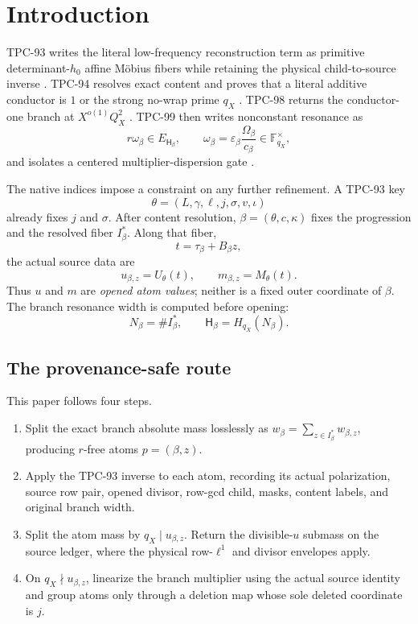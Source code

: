 \section{Introduction}
\label{sec:introduction}

TPC-93 writes the literal low-frequency reconstruction term as
primitive determinant-\(h_0\) affine M\"obius fibers while retaining
the physical child-to-source inverse \citep{WangTPC93}.  TPC-94
resolves exact content and proves that a literal additive conductor
is \(1\) or the strong no-wrap prime \(q_X\)
\citep{WangTPC94}.  TPC-98 returns the conductor-one branch at
\(X^{o(1)}Q_X^2\) \citep{WangTPC98}.  TPC-99 then writes
nonconstant resonance as
\[
 r\omega_\beta\in E_{\mathsf H_\beta},\qquad
 \omega_\beta
 =
 \varepsilon_\beta\frac{\Omega_\beta}{c_\beta}
 \in\mathbb F_{q_X}^{\times},
\]
and isolates a centered multiplier-dispersion gate
\citep{WangTPC99}.

The native indices impose a constraint on any further refinement.
A TPC-93 key
\[
 \theta=(L,\gamma,\ell,j,\sigma,v,\iota)
\]
already fixes \(j\) and \(\sigma\).  After content resolution,
\(\beta=(\theta,c,\kappa)\) fixes the progression and the resolved
fiber \(I_\beta^\ast\).  Along that fiber,
\[
 t=\tau_\beta+B_\beta z,
\]
the actual source data are
\[
 u_{\beta,z}=U_\theta(t),\qquad
 m_{\beta,z}=M_\theta(t).
\]
Thus \(u\) and \(m\) are \emph{opened atom values}; neither is a
fixed outer coordinate of \(\beta\).  The branch resonance width is
computed before opening:
\[
 N_\beta=\#I_\beta^\ast,\qquad
 \mathsf H_\beta=H_{q_X}(N_\beta).
\]

\subsection{The provenance-safe route}

This paper follows four steps.
\begin{enumerate}[leftmargin=2em]
\item Split the exact branch absolute mass losslessly as
  \(w_\beta=\sum_{z\in I_\beta^\ast}w_{\beta,z}\), producing
  \(r\)-free atoms \(p=(\beta,z)\).
\item Apply the TPC-93 inverse to each atom, recording its actual
  polarization, source row pair, opened divisor, row-gcd child,
  masks, content labels, and original branch width.
\item Split the atom mass by \(q_X\mid u_{\beta,z}\).  Return the
  divisible-\(u\) submass on the source ledger, where the physical
  row-\(\ell^1\) and divisor envelopes apply.
\item On \(q_X\nmid u_{\beta,z}\), linearize the branch multiplier
  using the actual source identity and group atoms only through a
  deletion map whose sole deleted coordinate is \(j\).
\end{enumerate}

